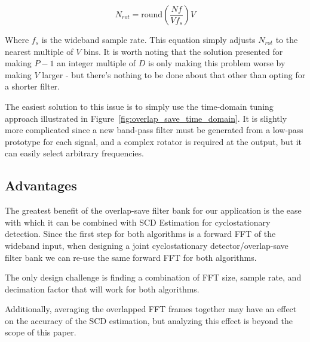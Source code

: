 \documentclass[12pt]{article}
\begin{document}
\begin{equation}
    N_{rot} = \text{round}\left( \frac{Nf}{Vf_s} \right) V
\end{equation}

Where $f_s$ is the wideband sample rate. This equation simply adjusts $N_{rot}$
to the nearest multiple of $V$ bins. It is worth noting that the solution
presented for making $P-1$ an integer multiple of $D$ is only making this
problem worse by making $V$ larger - but there's nothing to be done about that
other than opting for a shorter filter.

The easiest solution to this issue is to simply use the time-domain tuning
approach illustrated in Figure~\ref{fig:overlap_save_time_domain}. It is
slightly more complicated since a new band-pass filter must be generated from
a low-pass prototype for each signal, and a complex rotator is required at the
output, but it can easily select arbitrary frequencies.

\subsection{Advantages}
\label{sec:os_advantages}

The greatest benefit of the overlap-save filter bank for our application is the
ease with which it can be combined with SCD Estimation for cyclostationary
detection. Since the first step for both algorithms is a forward FFT of the
wideband input, when designing a joint cyclostationary detector/overlap-save
filter bank we can re-use the same forward FFT for both algorithms.


The only design challenge is finding a combination of FFT size, sample rate,
and decimation factor that will work for both algorithms.



Additionally, averaging the overlapped FFT frames together may have an effect
on the accuracy of the SCD estimation, but analyzing this effect is beyond the
scope of this paper.
\end{document}
